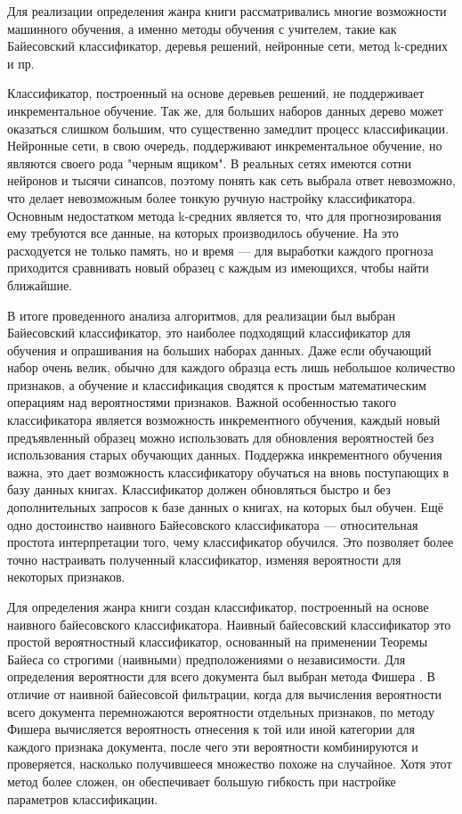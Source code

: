 Для реализации определения жанра книги рассматривались многие возможности машинного обучения, а именно методы обучения с учителем, такие как Байесовский классификатор, деревья решений, нейронные сети, метод k-средних и пр. \cite{collective-intelligence}

Классификатор, построенный на основе деревьев решений, не поддерживает инкрементальное обучение. Так же, для больших наборов данных дерево может оказаться слишком большим, что существенно замедлит процесс классификации. Нейронные сети, в свою очередь, поддерживают инкрементальное обучение, но являются своего рода "черным ящиком". В реальных сетях имеются сотни нейронов и тысячи синапсов, поэтому понять как сеть выбрала ответ невозможно, что делает невозможным более тонкую ручную настройку классификатора. Основным недостатком метода k-средних является то, что для прогнозирования ему требуются все данные, на которых производилось обучение. На это расходуется не только память, но и время --- для выработки каждого прогноза приходится сравнивать новый образец с каждым из имеющихся, чтобы найти ближайшие. 

В итоге проведенного анализа алгоритмов, для реализации был выбран Байесовский классификатор, \tk это наиболее подходящий классификатор для обучения и опрашивания на больших наборах данных. Даже если обучающий набор очень велик, обычно для каждого образца есть лишь небольшое количество признаков, а обучение и классификация сводятся к простым математическим операциям над вероятностями признаков. Важной особенностью такого классификатора является возможность инкрементного обучения, \te каждый новый предъявленный образец можно использовать для обновления вероятностей без использования старых обучающих данных. Поддержка инкрементного обучения важна, \tk это дает возможность классификатору обучаться на вновь поступающих в базу данных книгах. Классификатор должен обновляться быстро и без дополнительных запросов к базе данных о книгах, на которых был обучен. Ещё одно достоинство наивного Байесовского классификатора --- относительная простота интерпретации того, чему классификатор обучился. Это позволяет более точно настраивать полученный классификатор, изменяя вероятности для некоторых признаков.


 Для определения жанра книги создан классификатор, построенный на основе наивного байесовского классификатора. Наивный байесовский классификатор это простой вероятностный классификатор, основанный на применении Теоремы Байеса со строгими (наивными) предположениями о независимости. Для определения вероятности для всего документа был выбран метода Фишера \cite{collective-intelligence}. 
В отличие от наивной байесовсой фильтрации, когда для вычисления вероятности всего документа перемножаются вероятности отдельных признаков, по методу Фишера вычисляется вероятность отнесения к той или иной категории для каждого признака документа, после чего эти вероятности комбинируются и проверяется, насколько получившееся множество похоже на случайное. Хотя этот метод более сложен, он обеспечивает большую гибкость при настройке параметров классификации.

